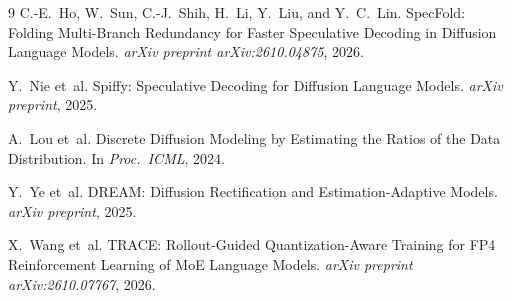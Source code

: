 \documentclass[11pt,a4paper]{article}
\begin{document}
\begin{thebibliography}{9}
C.-E.~Ho, W.~Sun, C.-J.~Shih, H.~Li, Y.~Liu, and Y.~C.~Lin.
\newblock SpecFold: Folding Multi-Branch Redundancy for Faster Speculative Decoding in Diffusion Language Models.
\newblock \emph{arXiv preprint arXiv:2610.04875}, 2026.

Y.~Nie et~al.
\newblock Spiffy: Speculative Decoding for Diffusion Language Models.
\newblock \emph{arXiv preprint}, 2025.

A.~Lou et~al.
\newblock Discrete Diffusion Modeling by Estimating the Ratios of the Data Distribution.
\newblock In \emph{Proc.\ ICML}, 2024.

Y.~Ye et~al.
\newblock DREAM: Diffusion Rectification and Estimation-Adaptive Models.
\newblock \emph{arXiv preprint}, 2025.

X.~Wang et~al.
\newblock TRACE: Rollout-Guided Quantization-Aware Training for FP4 Reinforcement Learning of MoE Language Models.
\newblock \emph{arXiv preprint arXiv:2610.07767}, 2026.
\end{thebibliography}
\end{document}

